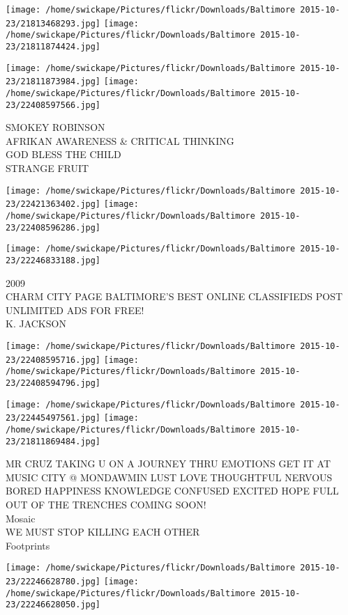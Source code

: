 \documentclass[10pt,letterpaper]{article}
\begin{document}
\texttt{[image: /home/swickape/Pictures/flickr/Downloads/Baltimore 2015-10-23/21813468293.jpg]}
\texttt{[image: /home/swickape/Pictures/flickr/Downloads/Baltimore 2015-10-23/21811874424.jpg]}

\texttt{[image: /home/swickape/Pictures/flickr/Downloads/Baltimore 2015-10-23/21811873984.jpg]}
\texttt{[image: /home/swickape/Pictures/flickr/Downloads/Baltimore 2015-10-23/22408597566.jpg]}

SMOKEY ROBINSON\\
AFRIKAN AWARENESS \& CRITICAL THINKING\\
GOD BLESS THE CHILD\\
STRANGE FRUIT
\pagebreak

\texttt{[image: /home/swickape/Pictures/flickr/Downloads/Baltimore 2015-10-23/22421363402.jpg]}
\texttt{[image: /home/swickape/Pictures/flickr/Downloads/Baltimore 2015-10-23/22408596286.jpg]}

\vspace{0.25in}
\texttt{[image: /home/swickape/Pictures/flickr/Downloads/Baltimore 2015-10-23/22246833188.jpg]}

2009\\
CHARM CITY PAGE BALTIMORE'S BEST ONLINE CLASSIFIEDS POST UNLIMITED ADS FOR FREE!\\
K. JACKSON
\pagebreak

\texttt{[image: /home/swickape/Pictures/flickr/Downloads/Baltimore 2015-10-23/22408595716.jpg]}
\texttt{[image: /home/swickape/Pictures/flickr/Downloads/Baltimore 2015-10-23/22408594796.jpg]}

\texttt{[image: /home/swickape/Pictures/flickr/Downloads/Baltimore 2015-10-23/22445497561.jpg]}
\texttt{[image: /home/swickape/Pictures/flickr/Downloads/Baltimore 2015-10-23/21811869484.jpg]}

MR CRUZ TAKING U ON A JOURNEY THRU EMOTIONS GET IT AT MUSIC CITY @ MONDAWMIN LUST LOVE THOUGHTFUL NERVOUS BORED HAPPINESS KNOWLEDGE CONFUSED EXCITED HOPE FULL OUT OF THE TRENCHES COMING SOON!\\
Mosaic\\
WE MUST STOP KILLING EACH OTHER\\
Footprints
\pagebreak

\texttt{[image: /home/swickape/Pictures/flickr/Downloads/Baltimore 2015-10-23/22246628780.jpg]}
\texttt{[image: /home/swickape/Pictures/flickr/Downloads/Baltimore 2015-10-23/22246628050.jpg]}
\end{document}

